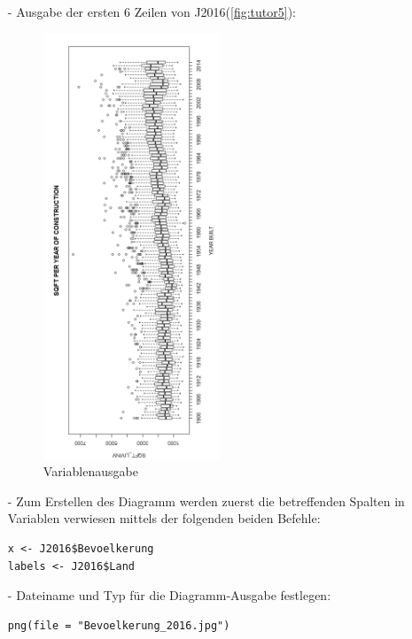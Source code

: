\begin{itemize}
\item[-]Ausgabe der ersten 6 Zeilen von J2016(\autoref{fig:tutor5}):
\begin{figure}[!htb]
        \begin{minipage}{1\textwidth}
                \centering
                \includegraphics[width=0.50\textwidth]{pics/tutor5.png}\par\vspace{0cm}
                \caption{Variablenausgabe}
                \label{fig:tutor5}
        \end{minipage}
\end{figure}
\item[-]Zum Erstellen des Diagramm werden zuerst die betreffenden Spalten in Variablen verwiesen mittels der folgenden beiden Befehle:
\begin{lstlisting}
x <- J2016$Bevoelkerung
labels <- J2016$Land
\end{lstlisting}
\item[-]Dateiname und Typ für die Diagramm-Ausgabe festlegen:
\begin{lstlisting}
png(file = "Bevoelkerung_2016.jpg")

\end{lstlisting}
\end{itemize}
